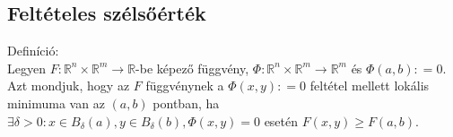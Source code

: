\documentclass[12pt,a4paper]{scrartcl}
\newenvironment{definicio}{}{}
\begin{document}
\hypertarget{felteteles-szelsoertek}{%
\subsection{Feltételes szélsőérték}\label{felteteles-szelsoertek}}

\begin{definicio}

Definíció:\\
Legyen
\(\left. F:{\mathbb{R}}^{n} \times {\mathbb{R}}^{m}\rightarrow{\mathbb{R}} \right.\)-be
képező függvény,
\(\left. \Phi:{\mathbb{R}}^{n} \times {\mathbb{R}}^{m}\rightarrow{\mathbb{R}}^{m} \right.\)
és \(\Phi\left( {a,b} \right): = 0\). Azt mondjuk, hogy az \(F\)
függvénynek a \(\Phi\left( {x,y} \right): = 0\) feltétel mellett lokális
minimuma van az \(\left( {a,b} \right)\) pontban, ha
\(\exists\delta > 0:x \in B_{\delta}\left( a \right),y \in B_{\delta}\left( b \right),\Phi\left( {x,y} \right) = 0\)
esetén \(F\left( {x,y} \right) \geq F\left( {a,b} \right)\).

\end{definicio}
\end{document}
